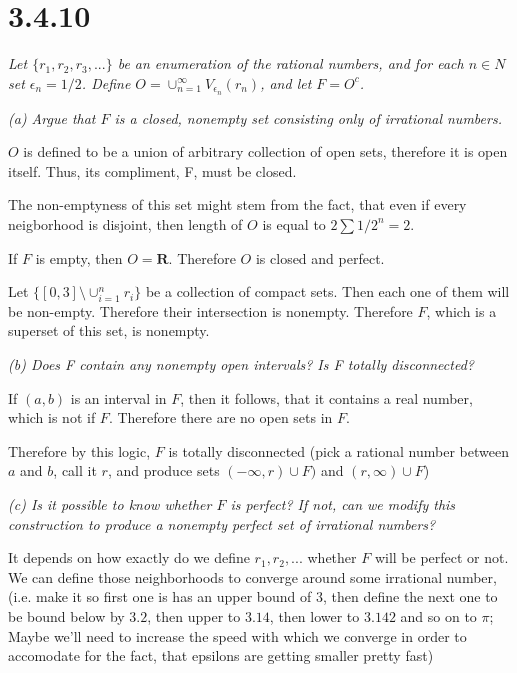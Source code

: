 \documentclass[11pt,oneside,titlepage]{book}
\begin{document}
\section*{3.4.10}
\textit{Let $\{r_1, r_2, r_3, ... \}$ be an enumeration of the rational
  numbers, and for each $n \in N$ set $\epsilon_n = 1/2$. Define
  $O = \cup_{n = 1}^{\infty}V_{\epsilon_n}(r_n)$, and let $F = O^c$.}

\textit{(a) Argue that $F$ is a closed, nonempty set consisting only of irrational numbers.}

$O$ is defined to be a union of arbitrary collection of open sets, therefore
it is open itself. Thus, its compliment, F,  must be closed.

The non-emptyness of this set might stem from the fact, that even if
every neigborhood is disjoint, then  length of $O$ is
equal to $2 \sum 1/2^n = 2$.

If $F$ is empty, then $O = \textbf{R}$. Therefore $O$ is closed and perfect.

Let $\{[0, 3] \setminus \cup_{i = 1}^{n}r_i\}$ be a collection of compact sets.
Then each one of them will be non-empty. Therefore their intersection
is nonempty. Therefore $F$, which is a superset of this set,  is nonempty.




\textit{(b) Does F contain any nonempty open intervals? Is F totally
  disconnected? }

If $(a, b)$ is an interval in $F$, then it follows, that it contains a real
number, which is not if $F$. Therefore there are no open sets in $F$.

Therefore by this logic, $F$ is totally disconnected (pick a rational
number between $a$ and $b$, call it $r$, and produce
sets $(-\infty, r) \cup F)$ and $(r, \infty) \cup F$)

\textit{(c) Is it possible to know whether $F$ is perfect? If not, can we
  modify this construction to produce a nonempty perfect set of irrational
  numbers?}

It depends on how exactly do we define $r_1, r_2,...$ whether $F$ will be
perfect or not. We can define those neighborhoods to converge around some
irrational number, (i.e. make it so first one is has an upper bound of 3,
then define the  next one to be bound below by $3.2$, then upper to $3.14$,
then lower to $3.142$ and so on to $\pi$; Maybe we'll need to increase the
speed with which we converge in order to accomodate for the fact, that
epsilons are getting smaller pretty fast)
\end{document}
